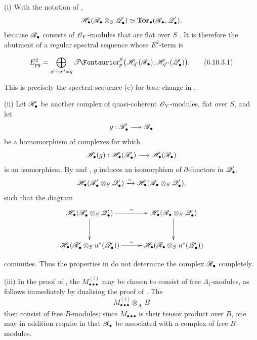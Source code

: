 \begin{remarks}[6.10.3]
\label{III.6.10.3}
\textnormal{(i)}
With the notation of ,
\[
  \mathscr{H}_\bullet
  (\mathscr{R}_\bullet\otimes_S\mathscr{Q}_\bullet')
  \simeq
  \mathbf{Tor}_\bullet(\mathscr{R}_\bullet,\mathscr{Q}_\bullet'),
\]
because $\mathscr{R}_\bullet$ consists of $\mathscr{O}_Y$-modules that are
flat over $S$ .  It is therefore
 the abutment of a regular spectral sequence
whose $E^2$-term is
\begin{env}[6.10.3.1]
\label{III.6.10.3.1}
\[
  E^2_{pq}
  =
  \bigoplus_{q'+q''=q}
  \shTor_p^S
  \bigl(
    \sh H_{q'}(\sh R_\bullet),
    \sh H_{q''}(\sh Q_\bullet')
  \bigr).
  \tag{6.10.3.1}\label{III.6.10.3.1.eq}
\]
\end{env}
This is precisely the spectral sequence (e) for base change in
.

\medskip
\textnormal{(ii)}
Let $\mathscr{R}_\bullet'$ be another complex of quasi-coherent
$\mathscr{O}_Y$-modules, flat over $S$, and let
\[
  g:\mathscr{R}_\bullet'\longrightarrow\mathscr{R}_\bullet
\]
be a homomorphism of complexes for which
\[
  \mathscr{H}_\bullet(g):
  \mathscr{H}_\bullet(\mathscr{R}_\bullet')
  \longrightarrow
  \mathscr{H}_\bullet(\mathscr{R}_\bullet)
\]
is an isomorphism.  By  and
, $g$ induces an isomorphism of
$\partial$-functors in $\mathscr{Q}_\bullet'$,
\[
  \mathscr{H}_\bullet
  (\mathscr{R}_\bullet'\otimes_S\mathscr{Q}_\bullet')
  \xrightarrow{\sim}
  \mathscr{H}_\bullet
  (\mathscr{R}_\bullet\otimes_S\mathscr{Q}_\bullet'),
\]
such that the diagram
\[
\xymatrix@C=28pt@R=30pt{
  \sh H_\bullet
  (\sh R_\bullet'\otimes_S\sh Q_\bullet')
  \ar[r]^-{\sim}\ar[d]
  &
  \sh H_\bullet
  (\sh R_\bullet\otimes_S\sh Q_\bullet')
  \ar[d]
  \\
  \sh H_\bullet
  (\sh R_\bullet'\otimes_Su^*(\sh Q_\bullet'))
  \ar[r]^-{\sim}
  &
  \sh H_\bullet
  (\sh R_\bullet\otimes_Su^*(\sh Q_\bullet'))
}
\]
\par\medskip\noindent
commutes.  Thus the properties in  do not
determine the complex $\mathscr{R}_\bullet$ completely.

\medskip
{}
\textnormal{(iii)}
In the proof of , the
$M_{\bullet\bullet\bullet}^{(i)}$ may be chosen to consist of
free $A_i$-modules, as follows immediately by dualising the
proof of .  The
\[
  M_{\bullet\bullet\bullet}^{(i)}\otimes_{A_i}B
\]
then consist of free $B$-modules; since
$M_{\bullet\bullet\bullet}$ is their tensor product over $B$,
one may in addition require in  that
$\mathscr{R}_\bullet$ be associated with a complex of free
$B$-modules.


\end{remarks}
